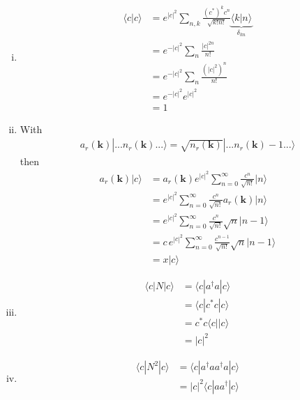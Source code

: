 \documentclass[../main.tex]{subfiles}
\begin{document}
\begin{enumerate}[(i)]
\item
\begin{align}
\langle c|c\rangle
&=e^{|c|^2}\sum_{n,k}\frac{(c^*)^kc^n}{\sqrt{k!n!}}\underbrace{\langle k|n\rangle}_{\delta_{kn}}\\
&=e^{-|c|^2}\sum_{n}\frac{|c|^{2n}}{n!}\\
&=e^{-|c|^2}\sum_{n}\frac{(|c|^2)^n}{n!}\\
&=e^{-|c|^2}e^{|c|^2}\\
&=1
\end{align}
\item With
\begin{align}
a_r(\mathbf{k})|...n_r(\mathbf{k})...\rangle
=\sqrt{n_r(\mathbf{k})}|...n_r(\mathbf{k})-1...\rangle
\end{align}
then
\begin{align}
a_r(\mathbf{k})|c\rangle
&=a_r(\mathbf{k})e^{|c|^2}\sum_{n=0}^\infty\frac{c^n}{\sqrt{n!}}|n\rangle\\
&=e^{|c|^2}\sum_{n=0}^\infty\frac{c^n}{\sqrt{n!}}a_r(\mathbf{k})|n\rangle\\
&=e^{|c|^2}\sum_{n=0}^\infty\frac{c^n}{\sqrt{n!}}\sqrt{n}|n-1\rangle\\
&=c\,e^{|c|^2}\sum_{n=0}^\infty\frac{c^{n-1}}{\sqrt{n!}}\sqrt{n}|n-1\rangle\\
&=x|c\rangle
\end{align}
\item
\begin{align}
\langle c|N|c\rangle
&=\langle c|a^\dagger a|c\rangle\\
&=\langle c|c^*c|c\rangle\\
&=c^*c\langle c||c\rangle\\
&=|c|^2
\end{align}

\item
\begin{align}
\langle c|N^2|c\rangle
&=\langle c|a^\dagger a a^\dagger a|c\rangle\\
&=|c|^2\langle c|a a^\dagger|c\rangle\\
\end{align}

\end{enumerate}
\end{document}
